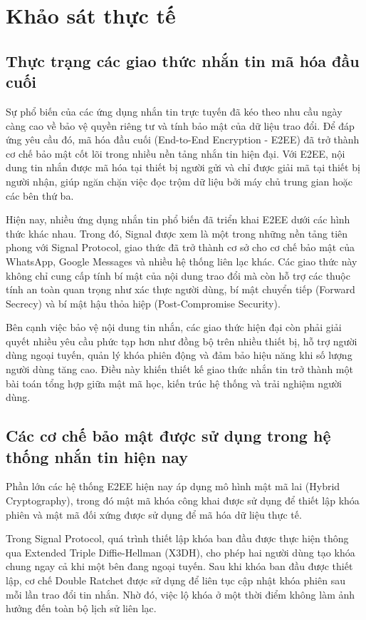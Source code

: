 \section{Khảo sát thực tế}

\subsection{Thực trạng các giao thức nhắn tin mã hóa đầu cuối}

Sự phổ biến của các ứng dụng nhắn tin trực tuyến đã kéo theo nhu cầu ngày càng cao về bảo vệ quyền riêng tư và tính bảo mật của dữ liệu trao đổi. Để đáp ứng yêu cầu đó, mã hóa đầu cuối (End-to-End Encryption - E2EE) đã trở thành cơ chế bảo mật cốt lõi trong nhiều nền tảng nhắn tin hiện đại. Với E2EE, nội dung tin nhắn được mã hóa tại thiết bị người gửi và chỉ được giải mã tại thiết bị người nhận, giúp ngăn chặn việc đọc trộm dữ liệu bởi máy chủ trung gian hoặc các bên thứ ba.

Hiện nay, nhiều ứng dụng nhắn tin phổ biến đã triển khai E2EE dưới các hình thức khác nhau. Trong đó, Signal được xem là một trong những nền tảng tiên phong với Signal Protocol, giao thức đã trở thành cơ sở cho cơ chế bảo mật của WhatsApp, Google Messages và nhiều hệ thống liên lạc khác. Các giao thức này không chỉ cung cấp tính bí mật của nội dung trao đổi mà còn hỗ trợ các thuộc tính an toàn quan trọng như xác thực người dùng, bí mật chuyển tiếp (Forward Secrecy) và bí mật hậu thỏa hiệp (Post-Compromise Security).

Bên cạnh việc bảo vệ nội dung tin nhắn, các giao thức hiện đại còn phải giải quyết nhiều yêu cầu phức tạp hơn như đồng bộ trên nhiều thiết bị, hỗ trợ người dùng ngoại tuyến, quản lý khóa phiên động và đảm bảo hiệu năng khi số lượng người dùng tăng cao. Điều này khiến thiết kế giao thức nhắn tin trở thành một bài toán tổng hợp giữa mật mã học, kiến trúc hệ thống và trải nghiệm người dùng.

\subsection{Các cơ chế bảo mật được sử dụng trong hệ thống nhắn tin hiện nay}

Phần lớn các hệ thống E2EE hiện nay áp dụng mô hình mật mã lai (Hybrid Cryptography), trong đó mật mã khóa công khai được sử dụng để thiết lập khóa phiên và mật mã đối xứng được sử dụng để mã hóa dữ liệu thực tế.

Trong Signal Protocol, quá trình thiết lập khóa ban đầu được thực hiện thông qua Extended Triple Diffie-Hellman (X3DH), cho phép hai người dùng tạo khóa chung ngay cả khi một bên đang ngoại tuyến. Sau khi khóa ban đầu được thiết lập, cơ chế Double Ratchet được sử dụng để liên tục cập nhật khóa phiên sau mỗi lần trao đổi tin nhắn. Nhờ đó, việc lộ khóa ở một thời điểm không làm ảnh hưởng đến toàn bộ lịch sử liên lạc.

